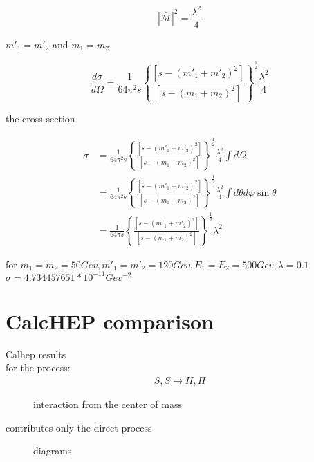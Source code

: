 \begin{equation}
  |\bar{ \mathcal{M} } |^2 = \frac{\lambda^2}{4}
\end{equation}

$m'_1 =m'_2 $ and $m_1 =m_2$  

\begin{equation}
  \frac{d\sigma}{d\Omega} = \frac{1}{64 \pi^2 s} \left\{ \frac{ [s-(m'_1 +m'_2)^2]}{[s-(m_1 + m_2)^2]} \right\}^{\frac{1}{2}}  \frac{\lambda^2}{4}  
\end{equation}

the cross section

\begin{equation}
  \begin{split}
    \sigma &= \frac{1}{64 \pi^2 s} \left\{ \frac{ [s-(m'_1 +m'_2)^2]}{[s-(m_1 + m_2)^2]} \right\}^{\frac{1}{2}}  \frac{\lambda^2}{4} \int{ d\Omega}\\
    &= \frac{1}{64 \pi^2 s} \left\{ \frac{ [s-(m'_1 +m'_2)^2]}{[s-(m_1 + m_2)^2]} \right\}^{\frac{1}{2}}  \frac{\lambda^2}{4} \int{ d\theta d\varphi \sin{\theta}}\\
    &= \frac{1}{64 \pi s} \left\{ \frac{ [s-(m'_1 +m'_2)^2]}{[s-(m_1 + m_2)^2]} \right\}^{\frac{1}{2}}  \lambda^2
  \end{split}
\end{equation}

for $m_1=m_2= 50  Gev, m'_1=m'_2=120  Gev,E_1=E_2=500  Gev, \lambda = 0.1$\\

$\sigma = 4.734457651 * 10^{-11} Gev^{-2}$

\section{CalcHEP comparison}

Calhep results\\

for the process:
\begin{align}
  S,S \to H,H 
\end{align}

\begin{figure}
  \centering
  \caption{interaction from the center of mass}
\end{figure}

contributes only the direct process

\begin{figure}
  \centering
  \caption{diagrams}
\end{figure}

